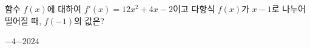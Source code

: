 함수 $f(x)$에 대하여 $f'(x)=12x^2+4x-2$이고 다항식 $f(x)$가 $x-1$로 나누어떨어질 때, $f(-1)$의 값은?
\begin{choices32}{$-4$}{$-2$}{$0$}{$2$}{$4$}\end{choices32}
